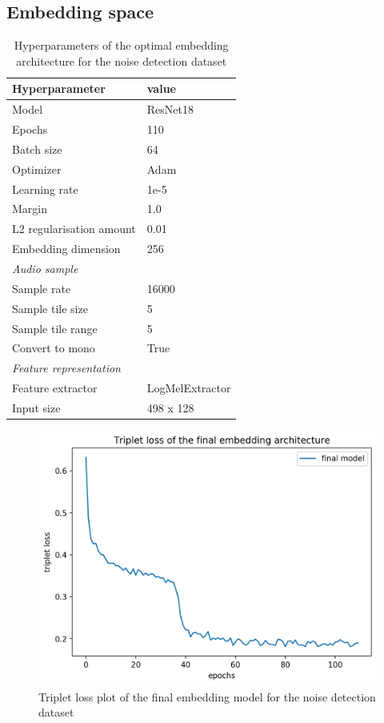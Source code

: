 \subsection{Embedding space}
\label{sub:Eval-Embedding-Space-DCASE}
\begin{table}[ht]
    \captionsetup{format=plain}
    \centering
    \caption{Hyperparameters of the optimal embedding architecture for the noise detection dataset}
	\label{tab:Hyperparameters-DCASE}
    \begin{tabular}{l|l}
        \toprule
        \textbf{Hyperparameter} & \textbf{value} \\ 
        \midrule[1pt]
        Model & ResNet18 \\ 
        \hline
        Epochs & 110 \\ 
        \hline
        Batch size & 64 \\ 
        \hline
        Optimizer & Adam \\ 
        \hline
        Learning rate & 1e-5 \\
        \hline
        Margin & 1.0 \\
        \hline
        L2 regularisation amount & 0.01 \\
        \hline
        Embedding dimension & 256 \\
        \midrule[1pt]
        \multicolumn{2}{l}{\textit{Audio sample}} \\
        \midrule[1pt]
        Sample rate & 16000 \\ 
        \hline
        Sample tile size & 5 \\
        \hline
        Sample tile range & 5 \\
        \hline
        Convert to mono & True \\
        \midrule[1pt]
        \multicolumn{2}{l}{\textit{Feature representation}} \\
        \midrule[1pt]
        Feature extractor & LogMelExtractor \\ 
        \hline
        Input size & 498 x 128 \\
        \bottomrule
    \end{tabular}
\end{table}
\begin{figure}[ht]
\centering
    \includegraphics[width=0.6\linewidth]{img/Triplet_loss_DCASE_final.png}
    \caption{Triplet loss plot of the final embedding model for the noise detection dataset}
    \label{fig:Triplet-Loss-DCASE}
\end{figure}
